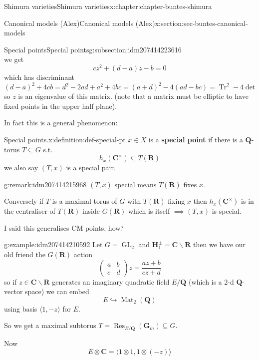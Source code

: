 \documentclass[oneside,10pt,]{book}
\newcommand{\terminology}[1]{\textbf{#1}}
\numberwithin{equation}{section}
\newcommand{\QQ}{\mathbf{Q}}
\newcommand{\RR}{\mathbf{R}}
\newcommand{\CC}{\mathbf{C}}
\DeclareMathOperator{\Res}{Res}
\DeclareMathOperator{\trace}{Tr}
\DeclareMathOperator{\Mat}{Mat}
\DeclareMathOperator{\GL}{GL}
\newcommand{\amp}{&}
\begin{document}
\begin{chapterptx}{Shimura varieties}{}{Shimura varieties}{}{}{x:chapter:chapter-buntes-shimura}
\begin{sectionptx}{Canonical models (Alex)}{}{Canonical models (Alex)}{}{}{x:section:sec-buntes-canonical-models}
\begin{subsectionptx}{Special points}{}{Special points}{}{}{g:subsection:idm207414223616}
\begin{equation*}
\end{equation*}
we get%
\begin{equation*}
cz^2 + (d - a) z - b = 0
\end{equation*}
which has discriminant \((d-a)^2 + 4cb = d^2 - 2ad + a^2 + 4bc =  (a+d)^2 - 4(ad - bc) = \trace^2 - 4\det\) so \(z\) is an eigenvalue of this matrix. (note that a matrix must be elliptic to have fixed points in the upper half plane).%
\par
In fact this is a general phenomenon:%
\begin{definition}{Special points.}{x:definition:def-special-pt}%
\(x \in X\) is a \terminology{special point} if there is a \(\QQ\)-torus \(T \subseteq G\) s.t.%
\begin{equation*}
h_x(\CC^\times) \subseteq T(\RR)
\end{equation*}
we also say \((T,x)\) is a special pair.%
\end{definition}
\begin{remark}{}{g:remark:idm207414215968}%
\((T,x)\) special means \(T(\RR)\) fixes \(x\).%
\par
Conversely if \(T\) is a maximal torus of \(G\) with \(T(\RR)\) fixing \(x\) then \(h_x(\CC^\times)\) is in the centraliser of \(T(\RR)\) inside \(G(\RR)\) which is itself \(\implies (T,x)\) is special.%
\end{remark}
I said this generalises CM points, how?%
\begin{example}{}{g:example:idm207414210592}%
Let \(G = \GL_2\) and \(\mathbf H_1^\pm = \CC \smallsetminus \RR\) then we have our old friend the \(G(\RR)\) action%
\begin{equation*}
\begin{pmatrix} a\amp b \\ c \amp d\end{pmatrix} z = \frac{az + b}{cz+d}
\end{equation*}
so if \(z \in \CC \smallsetminus \RR\) generates an imaginary quadratic field \(E/\QQ\) (which is a 2-d \(\QQ\)-vector space) we can embed%
\begin{equation*}
E \hookrightarrow \Mat_2(\QQ)
\end{equation*}
using basis \(\langle 1, -z\rangle\) for \(E\).%
\par
So we get a maximal subtorus \(T = \Res_{E/\QQ}(\mathbf G_m) \subseteq G\).%
\par
Now%
\begin{equation*}
E\otimes \CC = \langle 1\otimes 1, 1 \otimes (-z)\rangle
\end{equation*}

\end{example}
\end{subsectionptx}
\end{sectionptx}
\end{chapterptx}
\end{document}
